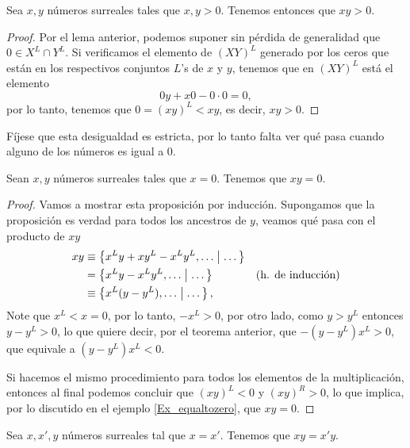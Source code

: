     \begin{theorem}
        Sea $x,y$ n\'umeros surreales tales que $x,y > 0$. Tenemos entonces que $xy>0$.
    \end{theorem}

    \begin{proof}
        Por el lema anterior, podemos suponer sin p\'erdida de generalidad que $0\in X^L\cap Y^L$. Si verificamos el elemento de $(XY)^L$ generado por los ceros que est\'an en los respectivos conjuntos $L$'s de $x$ y $y$, tenemos que en $(XY)^L$ est\'a el elemento
        \[
            0y + x0 - 0\cdot 0 = 0,
        \]
        por lo tanto, tenemos que $0 = (xy)^L < xy$, es decir, $xy > 0$.
    \end{proof}

    F\'ijese que esta desigualdad es estricta, por lo tanto falta ver qu\'e pasa cuando alguno de los n\'umeros es igual a $0$.
    
    \begin{theorem}
        Sean $x,y$ n\'umeros surreales tales que $x = 0$. Tenemos que $xy= 0$.
    \end{theorem}

    \begin{proof}
        Vamos a mostrar esta proposici\'on por inducci\'on. Supongamos que la proposici\'on es verdad para todos los ancestros de $y$, veamos qu\'e pasa con el producto de $xy$
        \begin{align*}
            xy & \equiv \left\{x^Ly + xy^L - x^Ly^L, \dots\;\middle|\; \dots\right\} & \\
                & = \left\{x^Ly - x^Ly^L,\dots\;\middle|\; \dots\right\} & \text{(h. de inducci\'on)}\\
                & \equiv \left\{x^L(y-y^L),\dots\;\middle|\; \dots\right\},
        \end{align*}
        Note que $x^L < x = 0$, por lo tanto, $-x^L > 0$, por otro lado, como $y > y^L$ entonces $y - y^L > 0$, lo que quiere decir, por el teorema anterior, que $-(y-y^L)x^L > 0$, que equivale a $(y-y^L)x^L < 0$.

        Si hacemos el mismo procedimiento para todos los elementos de la multiplicaci\'on, entonces al final podemos concluir que $(xy)^L < 0$ y $(xy)^R > 0$, lo que implica, por lo discutido en el ejemplo \ref*{Ex_equaltozero}, que $xy = 0$.
    \end{proof}

    \begin{corollary}[Compatibilidad con $=$]
        Sea $x,x',y$ n\'umeros surreales tal que $x = x'$. Tenemos que $xy = x'y$. 
    \end{corollary}

